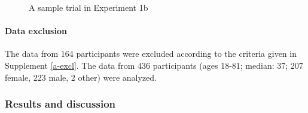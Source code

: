 \documentclass[11pt,fleqn]{article}
\newcommand{\6}{\mbox{$[\hspace*{-.6mm}[$}}
\newcommand{\9}{\mbox{$]\hspace*{-.6mm}]$}}
\begin{document}
\begin{figure}[h!]
\begin{center}
\end{center}
\caption{A sample trial in Experiment 1b}\label{fig-trial-exp1b}
\end{figure}

\paragraph{Data exclusion} The data from 164 participants were excluded according to the criteria given in Supplement \ref{a-excl}. The data from 436 participants (ages 18-81; median: 37; 207 female, 223 male, 2 other) were analyzed.

\subsubsection{Results and discussion}
\end{document}
